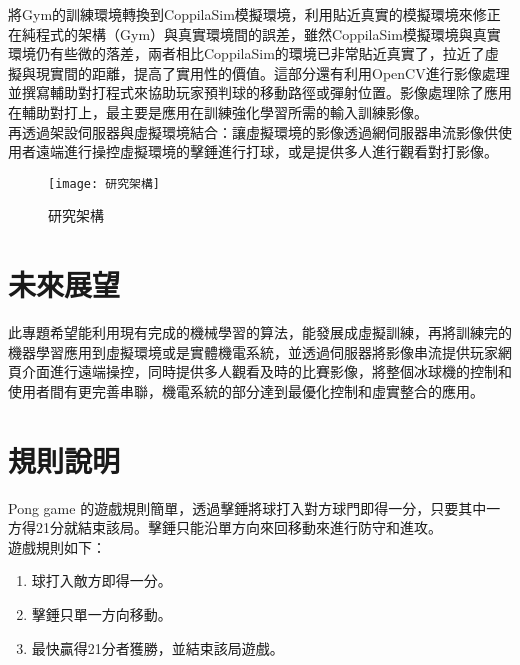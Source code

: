  將Gym的訓練環境轉換到CoppilaSim模擬環境，利用貼近真實的模擬環境來修正在純程式的架構（Gym）與真實環境間的誤差，雖然CoppilaSim模擬環境與真實環境仍有些微的落差，兩者相比CoppilaSim的環境已非常貼近真實了，拉近了虛擬與現實間的距離，提高了實用性的價值。這部分還有利用OpenCV進行影像處理並撰寫輔助對打程式來協助玩家預判球的移動路徑或彈射位置。影像處理除了應用在輔助對打上，最主要是應用在訓練強化學習所需的輸入訓練影像。\\
 
 再透過架設伺服器與虛擬環境結合：讓虛擬環境的影像透過網伺服器串流影像供使用者遠端進行操控虛擬環境的擊錘進行打球，或是提供多人進行觀看對打影像。
\begin{figure}[hbt!]
\begin{center}
\texttt{[image: 研究架構]}
\caption{\Large 研究架構 }
\label{研究架構 }
\end{center}
\end{figure}
\section{未來展望}
此專題希望能利用現有完成的機械學習的算法，能發展成虛擬訓練，再將訓練完的機器學習應用到虛擬環境或是實體機電系統，並透過伺服器將影像串流提供玩家網頁介面進行遠端操控，同時提供多人觀看及時的比賽影像，將整個冰球機的控制和使用者間有更完善串聯，機電系統的部分達到最優化控制和虛實整合的應用。
\section{規則說明}
 Pong game 的遊戲規則簡單，透過擊錘將球打入對方球門即得一分，只要其中一方得21分就結束該局。擊錘只能沿單方向來回移動來進行防守和進攻。\\
遊戲規則如下：
\begin{enumerate}
\item 球打入敵方即得一分。
\item 擊錘只單一方向移動。
\item 最快贏得21分者獲勝，並結束該局遊戲。
\end{enumerate}

\renewcommand{\baselinestretch}{0.5} %